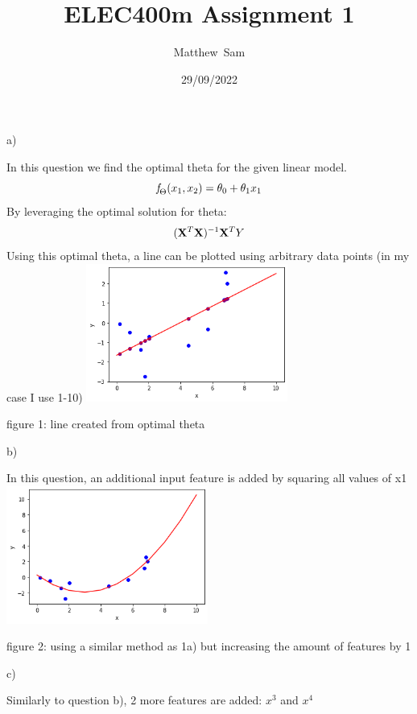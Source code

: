 \documentclass{homework}
\title{ELEC400m Assignment 1}
\author{Matthew\ Sam}
\date{29/09/2022}
\begin{document}
\maketitle

\exercise
a)

In this question we find the optimal theta for the given linear model.
\[
\emph{f} _{\Theta}(x _{1}, x _{2}) = \theta _{0} + \theta _{1}x_{1}
\]
By leveraging the optimal solution for theta:
\[
(\bold{X}^{T}\bold{X})^{-1}\bold{X}^{T}Y
\]
Using this optimal theta, a line can be plotted using arbitrary data points (in my case I use 1-10)
\centering
\includegraphics[width=250]{1a.png}

\caption{figure 1: line created from optimal theta}

\raggedright
b)

In this question, an additional input feature is added by squaring all values of x1
\centering
\includegraphics[width=250]{1b.png}

\caption{figure 2: using a similar method as 1a) but increasing the amount of features by 1}

\raggedright
c)

Similarly to question b), 2 more features are added: \(x^3\) and \(x^4\)
\end{document}
